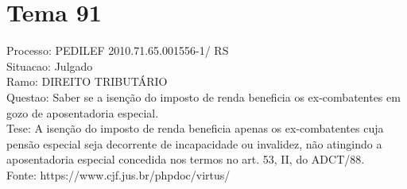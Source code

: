 \documentclass[12pt]{article}
\begin{document}
\section*{Tema 91}
Processo: PEDILEF 2010.71.65.001556-1/ RS\\
Situacao: Julgado\\
Ramo: DIREITO TRIBUTÁRIO\\
Questao: Saber se a isenção do imposto de renda beneficia os ex-combatentes em gozo de aposentadoria especial.\\
Tese: A isenção do imposto de renda beneficia apenas os ex-combatentes cuja pensão especial seja decorrente de incapacidade ou invalidez, não atingindo a aposentadoria especial concedida nos termos no art. 53, II, do ADCT/88.\\
Fonte: https://www.cjf.jus.br/phpdoc/virtus/
\end{document}
